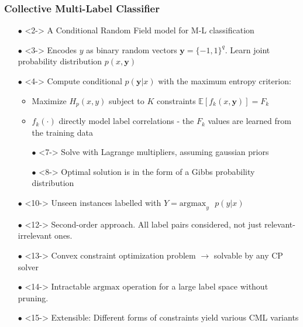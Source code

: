 \documentclass{beamer}
\begin{document}
\begin{frame}
\frametitle{Collective Multi-Label Classifier}
\begin{itemize}
\item[$\bullet$] <2-> A Conditional Random Field model for M-L classification
\item[$\bullet$] <3-> Encodes $y$ as binary random vectors $\bm{y}=\{-1,1\}^q$.
  Learn joint probability distribution $p(x,\bm{y})$
\item[$\bullet$] <4-> Compute conditional $p(\bm{y} | x)$ with the maximum entropy criterion:
  \begin{itemize}
    \item <5-> Maximize $H_p(x,y)$ subject to $K$ constraints $\mathbb{E}[f_k(x,\bm{y})] = F_k$
    \item <6-> $f_k(\cdot)$ directly model label correlations - the $F_k$ values are learned from the training data
  \item[$\bullet$] <7-> Solve with Lagrange multipliers, assuming gaussian priors
  \item[$\bullet$] <8-> Optimal solution is in the form of a Gibbs probability distribution
  \end{itemize}
\item[$\bullet$] <10-> Unseen instances labelled with $Y = \text{argmax}_y\text{ } p(y | x)$
\end{itemize}
\begin{itemize}
\item[$\bullet$] <12-> Second-order approach. All label pairs considered, not just relevant-irrelevant ones.
\item[$\bullet$] <13-> Convex constraint optimization problem $\rightarrow$ solvable by any CP solver
\item[$\bullet$] <14-> Intractable $\text{argmax}$ operation for a large label space without pruning.
\item[$\bullet$] <15-> Extensible: Different forms of constraints yield various CML variants
\end{itemize}
\end{frame}
\end{document}
